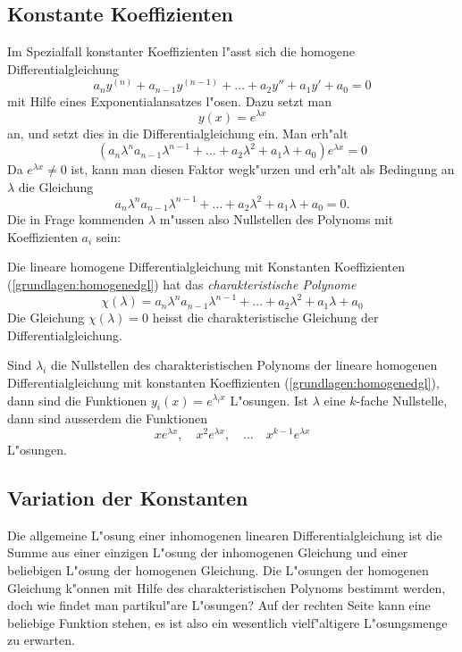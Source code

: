 \subsection{Konstante Koeffizienten}
Im Spezialfall konstanter Koeffizienten l"asst sich die homogene
Differentialgleichung
\begin{equation}
a_ny^{(n)}+a_{n-1}y^{(n-1)}+\dots+a_2y''+a_1y'+a_0=0
\label{grundlagen:homogenedgl}
\end{equation}
mit Hilfe eines Exponentialansatzes l"osen.
Dazu setzt man 
\[
y(x)=e^{\lambda x}
\]
an, und setzt dies in die Differentialgleichung ein.
Man erh"alt
\[
(a_n\lambda^n a_{n-1}\lambda^{n-1}+\dots+a_2\lambda^2+a_1\lambda+a_0)e^{\lambda x}=0
\]
Da $e^{\lambda x}\ne 0$ ist, kann man diesen Faktor wegk"urzen und erh"alt
als Bedingung an $\lambda$ die Gleichung
\[
a_n\lambda^n a_{n-1}\lambda^{n-1}+\dots+a_2\lambda^2+a_1\lambda+a_0=0.
\]
Die in Frage kommenden $\lambda$ m"ussen also Nullstellen des Polynoms
mit Koeffizienten $a_i$ sein:

\begin{definition}
Die lineare homogene Differentialgleichung mit Konstanten Koeffizienten
(\ref{grundlagen:homogenedgl}) hat das {\em charakteristische Polynome}
\begin{equation}
\chi(\lambda)
=
a_n\lambda^n a_{n-1}\lambda^{n-1}+\dots+a_2\lambda^2+a_1\lambda+a_0
\end{equation}
Die Gleichung $\chi(\lambda)=0$ heisst die charakteristische Gleichung
der Differentialgleichung.
\end{definition}

\begin{satz}
Sind $\lambda_i$ die Nullstellen des charakteristischen Polynoms der
lineare homogenen Differentialgleichung mit konstanten Koeffizienten
(\ref{grundlagen:homogenedgl}), dann sind die Funktionen
$y_i(x)=e^{\lambda_i x}$ L"osungen.
Ist $\lambda$ eine $k$-fache Nullstelle, dann sind ausserdem die
Funktionen
\[
xe^{\lambda x},\quad x^2e^{\lambda x},\quad\dots\quad x^{k-1}e^{\lambda x}
\]
L"osungen.
\end{satz}

%
%

\subsection{Variation der Konstanten}
Die allgemeine L"osung einer inhomogenen linearen Differentialgleichung ist die
Summe aus einer einzigen L"osung der inhomogenen Gleichung und einer
beliebigen L"osung der homogenen Gleichung.
Die L"osungen der homogenen Gleichung k"onnen mit Hilfe des charakteristischen
Polynoms bestimmt werden, doch wie findet man partikul"are L"osungen?
Auf der rechten Seite kann eine beliebige Funktion stehen, es ist also
ein wesentlich vielf"altigere L"osungsmenge zu erwarten.

